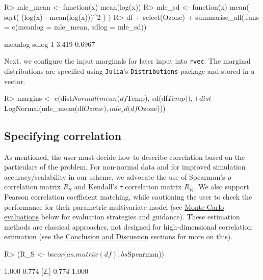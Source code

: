 \documentclass[
]{jss}
\begin{document}
\begin{CodeChunk}
\begin{CodeInput}
R> mle_mean <- function(x) mean(log(x))
R> mle_sd <- function(x) mean( sqrt( (log(x) - mean(log(x)))^2 ) )
R> df %
+   select(Ozone) %
+   summarise_all(.funs = c(meanlog = mle_mean, sdlog = mle_sd))
\end{CodeInput}
\begin{CodeOutput}
  meanlog  sdlog
1   3.419 0.6967
\end{CodeOutput}
\end{CodeChunk}

Next, we configure the input marginals for later input into
\texttt{rvec}. The marginal distributions are specified using
\texttt{Julia}'s \texttt{Distributions} package and stored in a vector.

\begin{CodeChunk}
\begin{CodeInput}
R> margins <- c(dist$Normal(mean(df$Temp), sd(df$Temp)),
+              dist$LogNormal(mle_mean(df$Ozone), mle_sd(df$Ozone)))
\end{CodeInput}
\end{CodeChunk}

\hypertarget{specifying-correlation}{%
\subsection{Specifying correlation}\label{specifying-correlation}}

As mentioned, the user must decide how to describe correlation based on
the particulars of the problem. For non-normal data and for improved
simulation accuracy/scalability in our scheme, we advocate the use of
Spearman's \(\rho\) correlation matrix \(R_S\) and Kendall's \(\tau\)
correlation matrix \(R_K\). We also support Pearson correlation
coefficient matching, while cautioning the user to check the performance
for their parametric multivariate model (see
\protect\hyperlink{simulations}{Monte Carlo evaluations} below for
evaluation strategies and guidance). These estimation methods are
classical approaches, not designed for high-dimensional correlation
estimation (see the \href{\%7B\#discussion}{Conclusion and Discussion}
sections for more on this).

\begin{CodeChunk}
\begin{CodeInput}
R> (R_S <- bs$cor(as.matrix(df), bs$Spearman))
\end{CodeInput}
\begin{CodeOutput}
      [,1]  [,2]
[1,] 1.000 0.774
[2,] 0.774 1.000
\end{CodeOutput}
\end{CodeChunk}
\end{document}
